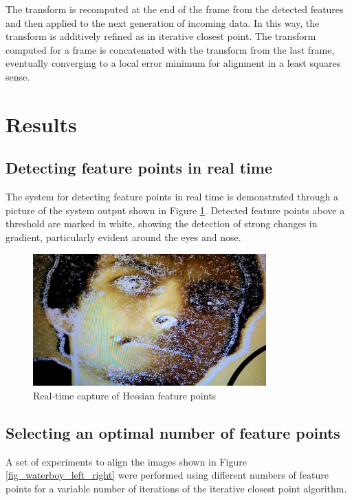 \documentclass[sigconf]{acmart/acmart}
\begin{document}
The transform is recomputed at the end of the frame from the detected features and then applied to the next generation of incoming data. In this way, the transform is additively refined as in iterative closest point. The transform computed for a frame is concatenated with the transform from the last frame, eventually converging to a local error minimum for alignment in a least squares sense. 

\section{Results}

\subsection{Detecting feature points in real time}

The system for detecting feature points in real time is demonstrated through a picture of the system output shown in Figure \ref{fig_pic_features}. Detected feature points above a threshold are marked in white, showing the detection of strong changes in gradient, particularly evident around the eyes and nose.

\begin{figure}[h]
	\centering
	\includegraphics[width=0.8\textwidth]{figures/pictures/features}
	\caption{Real-time capture of Hessian feature points}
	\label{fig_pic_features}
\end{figure}

\subsection{Selecting an optimal number of feature points}

A set of experiments to align the images shown in Figure \ref{fig_waterboy_left_right} were performed using different numbers of feature points for a variable number of iterations of the iterative closest point algorithm.
\end{document}
